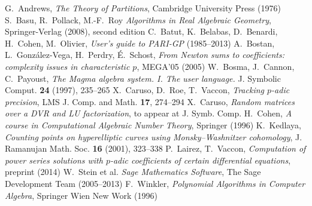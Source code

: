 \documentclass{article}
\begin{document}
\begin{thebibliography}{99}
{}
  G.~Andrews,
  \emph{The Theory of Partitions},
  Cambridge University Press (1976)
  S.~Basu, R.~Pollack, M.-F.~Roy
  \emph{Algorithms in Real Algebraic Geometry},
  Springer-Verlag (2008), second edition
  C.~Batut, K.~Belabas, D.~Benardi, H.~Cohen, M.~Olivier, 
  \emph{User’s guide to PARI-GP} (1985--2013)
  A.~Bostan, L.~Gonz\'alez-Vega, H.~Perdry, É.~Schost, 
  \emph{From Newton sums to coefficients: complexity issues in characteristic $p$}, 
  MEGA’05 (2005)
  W.~Bosma, J.~Cannon, C.~Payoust, 
  \emph{The Magma algebra system. I. The user language.}
  J. Symbolic Comput. {\bf 24} (1997), 235--265
  X.~Caruso, D.~Roe, T.~Vaccon,
  \emph{Tracking $p$-adic precision},
  LMS J. Comp. and Math. {\bf 17}, 274--294
  X.~Caruso,
  \emph{Random matrices over a DVR and LU factorization},
  to appear at J. Symb. Comp.
  H.~Cohen,
  \emph{A course in Computational Algebraic Number Theory},
  Springer (1996)
  K.~Kedlaya,
  \emph{Counting points on hyperelliptic curves using Monsky--Washnitzer cohomology}, 
  J. Ramanujan Math. Soc. {\bf 16} (2001), 323--338
  P.~Lairez, T.~Vaccon,
  \emph{Computation of power series solutions with $p$-adic coefficients of certain differential equations},
  preprint (2014)
  W.~Stein et al.
  \emph{Sage Mathematics Software}, 
  The Sage Development Team (2005--2013)
  F.~Winkler,
  \emph{Polynomial Algorithms in Computer Algebra},
  Springer Wien New Work (1996)
\end{thebibliography}
\end{document}
